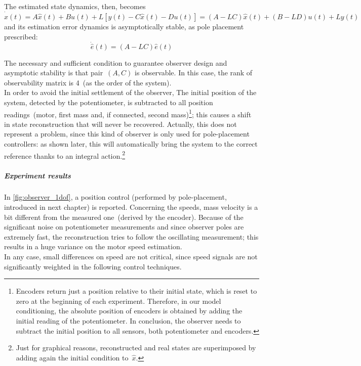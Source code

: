 The estimated state dynamics, then, becomes
\begin{equation}
	\dot{\hat{x}}(t) = A\hat{x}(t) + Bu(t) + L [y(t) - C\hat{x}(t) - Du(t)] = (A-LC)\hat{x}(t) + (B-LD)u(t) + Ly(t)
	\label{eqn:est_state_dyn}
\end{equation}
and its estimation error dynamics is asymptotically stable, as pole placement prescribed:
\begin{equation}
	\dot{\hat{e}} (t) = (A-LC) \hat{e} (t)
\end{equation}

The necessary and sufficient condition to guarantee observer design and asymptotic stability is that pair~$(A,C)$ is observable. In this case, the rank of observability matrix is 4~(as the order of the system). \\
In order to avoid the initial settlement of the observer, 
The initial position of the system, detected by the potentiometer, is subtracted to all position readings~(motor, first mass and, if connected, second mass)\footnote{Encoders return just a position relative to their initial state, which is reset to zero at the beginning of each experiment. Therefore, in our model conditioning, the absolute position of encoders is obtained by adding the initial reading of the potentiometer. In conclusion, the observer needs to subtract the initial position to all sensors, both potentiometer and encoders.}; this causes a shift in state reconstruction that will never be recovered. Actually, this does not represent a problem, since this kind of observer is only used for pole-placement controllers: as shown later, this will automatically bring the system to the correct reference thanks to an integral action.\footnote{Just for graphical reasons, reconstructed and real states are superimposed by adding again the initial condition to~$\hat x$.}

\subparagraph{Experiment results}
In \cref{fig:observer_1dof}, a position control (performed by pole-placement, introduced in next chapter) is reported. 
Concerning the speeds, mass velocity is a bit different from the measured one~(derived by the encoder). Because of the significant noise on potentiometer measurements and since observer poles are extremely fast, the reconstruction tries to follow the oscillating measurement; this results in a huge variance on the motor speed estimation. \\
In any case, small differences on speed are not critical, since speed signals are not significantly weighted in the following control techniques.

